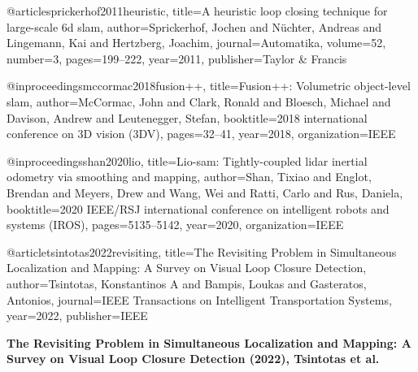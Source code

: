 



@article{sprickerhof2011heuristic,
  title={A heuristic loop closing technique for large-scale 6d slam},
  author={Sprickerhof, Jochen and N{\"u}chter, Andreas and Lingemann, Kai and Hertzberg, Joachim},
  journal={Automatika},
  volume={52},
  number={3},
  pages={199--222},
  year={2011},
  publisher={Taylor \& Francis}
}







@inproceedings{mccormac2018fusion++,
  title={Fusion++: Volumetric object-level slam},
  author={McCormac, John and Clark, Ronald and Bloesch, Michael and Davison, Andrew and Leutenegger, Stefan},
  booktitle={2018 international conference on 3D vision (3DV)},
  pages={32--41},
  year={2018},
  organization={IEEE}
}




@inproceedings{shan2020lio,
  title={Lio-sam: Tightly-coupled lidar inertial odometry via smoothing and mapping},
  author={Shan, Tixiao and Englot, Brendan and Meyers, Drew and Wang, Wei and Ratti, Carlo and Rus, Daniela},
  booktitle={2020 IEEE/RSJ international conference on intelligent robots and systems (IROS)},
  pages={5135--5142},
  year={2020},
  organization={IEEE}
}

@article{tsintotas2022revisiting,
  title={The Revisiting Problem in Simultaneous Localization and Mapping: A Survey on Visual Loop Closure Detection},
  author={Tsintotas, Konstantinos A and Bampis, Loukas and Gasteratos, Antonios},
  journal={IEEE Transactions on Intelligent Transportation Systems},
  year={2022},
  publisher={IEEE}
}

\textbf{The Revisiting Problem in Simultaneous Localization and Mapping: A Survey on Visual Loop Closure Detection (2022), Tsintotas et al.}

